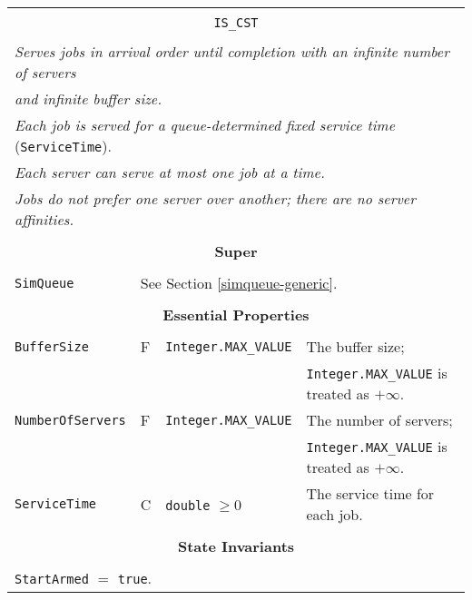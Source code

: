 \documentclass[12pt]{book}
\begin{document}
\begin{tabular}{|l|l|l|l|}
\hline
\multicolumn{4}{|c|}{} \\
\multicolumn{4}{|c|}{\lstinline[basicstyle=\large]{IS_CST}} \\
\multicolumn{4}{|c|}{} \\
\hline
\multicolumn{4}{|l|}{\em Serves jobs in arrival order until completion with an infinite number of servers} \\
\multicolumn{4}{|l|}{\em and infinite buffer size.} \\
\multicolumn{4}{|l|}{{\em Each job is served for a queue-determined fixed service time\/} (\lstinline|ServiceTime|).} \\
\multicolumn{4}{|l|}{\em Each server can serve at most one job at a time.} \\
\multicolumn{4}{|l|}{\em Jobs do not prefer one server over another; there are no server affinities.} \\
\hline
\multicolumn{4}{|c|}{} \\
\multicolumn{4}{|c|}{\bf Super} \\
\multicolumn{4}{|c|}{} \\
\hline
\lstinline|SimQueue| & \multicolumn{3}{|l|}{See Section \ref{simqueue-generic}.} \\
\hline
\multicolumn{4}{|c|}{} \\
\multicolumn{4}{|c|}{\bf Essential Properties} \\
\multicolumn{4}{|c|}{} \\
\hline
\lstinline|BufferSize|      & F & \lstinline|Integer.MAX_VALUE|
                            & The buffer size; \\
                        & & & \lstinline|Integer.MAX_VALUE| is treated as $+\infty$. \\
\hline
\lstinline|NumberOfServers| & F & \lstinline|Integer.MAX_VALUE|
                            & The number of servers; \\
                        & & & \lstinline|Integer.MAX_VALUE| is treated as $+\infty$. \\
\hline
\lstinline|ServiceTime|     & C & \lstinline|double| $\geq 0$
                            & The service time for each job. \\
\hline
\multicolumn{4}{|c|}{} \\
\multicolumn{4}{|c|}{\bf State  Invariants} \\
\multicolumn{4}{|c|}{} \\
\hline
\multicolumn{4}{|l|}{\lstinline|StartArmed| $=$ \lstinline|true|.} \\

\end{tabular}
\end{document}
